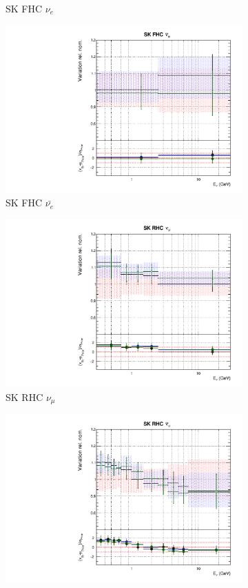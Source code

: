 \begin{figure}
\begin{subfigure}{0.24\textwidth}
  \caption{SK FHC $\nu_{e}$}
\end{subfigure}
\begin{subfigure}{0.24\textwidth}
  \centering
  \includegraphics[width=0.95\linewidth]{figs/newolddatafitsflux_11}
  \caption{SK FHC $\bar{\nu_{e}}$}
\end{subfigure}
\begin{subfigure}{0.24\textwidth}
  \centering
  \includegraphics[width=0.95\linewidth]{figs/newolddatafitsflux_12}
  \caption{SK RHC $\nu_{\mu}$}
\end{subfigure}
\begin{subfigure}{0.24\textwidth}
  \centering
  \includegraphics[width=0.95\linewidth]{figs/newolddatafitsflux_13}

\end{subfigure}
\end{figure}
